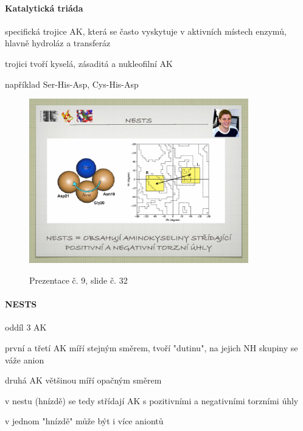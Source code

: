 \documentclass[DIV=8]{scrreprt}
\begin{document}
\paragraph{Katalytická triáda}
\begin{myItemize}[nosep]
    \item specifická trojice AK, která se často vyskytuje v aktivních místech enzymů, hlavně hydroláz a transferáz
    \item trojici tvoří kyselá, zásaditá a nukleofilní AK
\begin{myItemize}[nosep]
    \item například Ser-His-Asp, Cys-His-Asp
\end{myItemize}

\end{myItemize}



\begin{figure}
    \caption{Prezentace č. 9, slide č. 32}
    \includegraphics[width=0.85\textwidth]{slides-9/slide-32.jpg}
    \centering
    \label{slides-9-slide-32}
\end{figure}

\paragraph{NESTS}
\begin{myItemize}[nosep]
    \item oddíl 3 AK
\begin{myItemize}[nosep]
    \item první a třetí AK míří stejným směrem, tvoří "dutinu", na jejich NH skupiny se váže anion
    \item druhá AK většinou míří opačným směrem
\end{myItemize}

    \item v nestu (hnízdě) se tedy střídají AK s pozitivními a negativními torzními úhly
    \item v jednom "hnízdě" může být i více aniontů
\end{myItemize}
\end{document}
